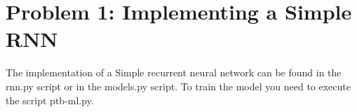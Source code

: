 \section{Problem 1: Implementing a Simple RNN}

The implementation of a Simple recurrent neural network can be found in the rnn.py script or in the models.py script. To train the model you need to execute the script ptb-ml.py.




